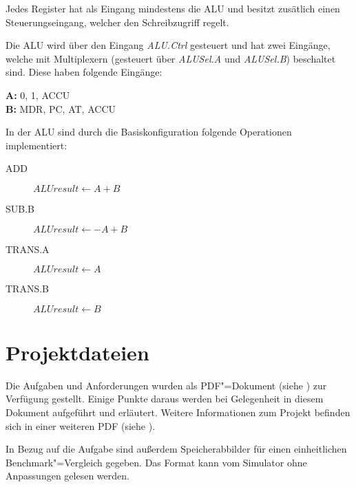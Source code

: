 Jedes Register hat als Eingang mindestens die ALU und besitzt zusätlich einen Steuerungseingang, welcher den Schreibzugriff regelt.

Die ALU wird über den Eingang \emph{ALU.Ctrl} gesteuert und  hat zwei Eingänge, welche mit Multiplexern (gesteuert über \emph{ALUSel.A} und \emph{ALUSel.B}) beschaltet sind. Diese haben folgende Eingänge:

\textbf{A:} 0, 1, ACCU\\
\textbf{B:} MDR, PC, AT, ACCU 

In der ALU sind durch die Basiskonfiguration folgende Operationen implementiert:

\begin{description}
    \item[ADD] $ALUresult \gets A + B$
    \item[SUB.B] $ALUresult \gets -A + B$
    \item[TRANS.A] $ALUresult \gets A$
    \item[TRANS.B] $ALUresult \gets B$
\end{description}



\section{Projektdateien}
\label{section:Pflichtenheft-Istzustand-Projektdateien}

Die Aufgaben und Anforderungen wurden als PDF"=Dokument (siehe \cite{aufgabenblatt}) zur Verfügung gestellt. Einige Punkte daraus werden bei Gelegenheit in diesem Dokument aufgeführt und erläutert. Weitere Informationen zum Projekt befinden sich in einer weiteren PDF (siehe \cite{projektinfo}).

In Bezug auf die Aufgabe sind außerdem Speicherabbilder für einen einheitlichen Benchmark"=Vergleich gegeben. Das Format kann vom Simulator ohne Anpassungen gelesen werden.

